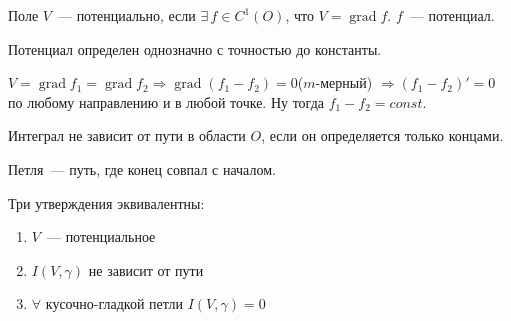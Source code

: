 \begin{defin*}
	Поле $V$~--- потенциально, если $\exists\,f\in C^1(O)$, что $V=\operatorname{grad}f$. $f$~--- потенциал.
\end{defin*}

\begin{Theorem*}
	Потенциал определен однозначно с точностью до константы.
\end{Theorem*}

\begin{Proof}
	$V=\operatorname{grad}f_1=\operatorname{grad}f_2\Rightarrow\operatorname{grad}(f_1-f_2)=0$($m$-мерный) $\Rightarrow (f_1-f_2)'=0$ по любому направлению и в любой точке. Ну тогда $f_1-f_2=const$. 
\end{Proof}

\begin{defin*}
	Интеграл не зависит от пути в области $O$, если он определяется только концами.
\end{defin*}

\begin{defin*}
	Петля~--- путь, где конец совпал с началом.
\end{defin*}

\begin{Theorem*}
	Три утверждения эквивалентны:
	\begin{enumerate}
		\item $V$~--- потенциальное
		\item $I(V,\gamma)$ не зависит от пути
		\item $\forall$ кусочно-гладкой петли $I(V,\gamma)=0$
	\end{enumerate}
\end{Theorem*}

